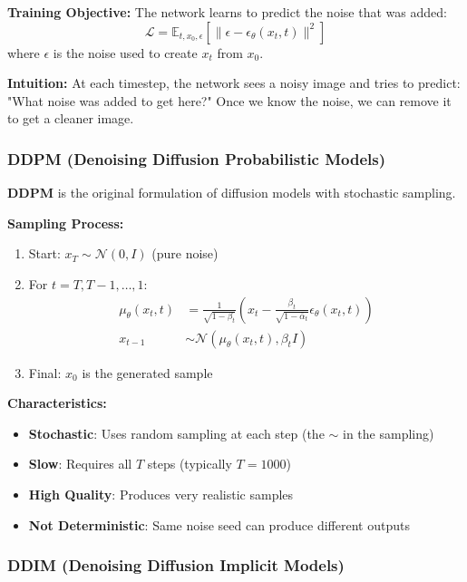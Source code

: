 \documentclass[12pt,a4paper]{article}
\begin{document}
\textbf{Training Objective:} The network learns to predict the noise that was added:
\begin{equation}
\mathcal{L} = \mathbb{E}_{t, x_0, \epsilon} \left[ \|\epsilon - \epsilon_\theta(x_t, t)\|^2 \right]
\end{equation}
where $\epsilon$ is the noise used to create $x_t$ from $x_0$.

\textbf{Intuition:} At each timestep, the network sees a noisy image and tries to predict: "What noise was added to get here?" Once we know the noise, we can remove it to get a cleaner image.

\subsubsection{DDPM (Denoising Diffusion Probabilistic Models)}

\textbf{DDPM} is the original formulation of diffusion models with stochastic sampling.

\textbf{Sampling Process:}
\begin{enumerate}
    \item Start: $x_T \sim \mathcal{N}(0, I)$ (pure noise)
    \item For $t = T, T-1, \ldots, 1$:
    \begin{align}
        \mu_\theta(x_t, t) &= \frac{1}{\sqrt{1-\beta_t}}\left(x_t - \frac{\beta_t}{\sqrt{1-\bar{\alpha}_t}} \epsilon_\theta(x_t, t)\right) \\
        x_{t-1} &\sim \mathcal{N}(\mu_\theta(x_t, t), \beta_t I)
    \end{align}
    \item Final: $x_0$ is the generated sample
\end{enumerate}

\textbf{Characteristics:}
\begin{itemize}
    \item \textbf{Stochastic}: Uses random sampling at each step (the $\sim$ in the sampling)
    \item \textbf{Slow}: Requires all $T$ steps (typically $T=1000$)
    \item \textbf{High Quality}: Produces very realistic samples
    \item \textbf{Not Deterministic}: Same noise seed can produce different outputs
\end{itemize}

\subsubsection{DDIM (Denoising Diffusion Implicit Models)}
\end{document}
